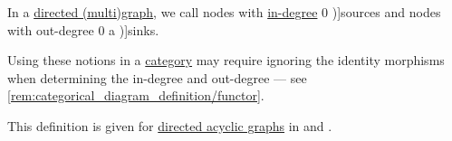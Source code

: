 \begin{definition}\label{def:graph_source_and_sink}\mimprovised
  In a \hyperref[def:directed_multigraph]{directed (multi)graph}, we call nodes with \hyperref[def:graph_cardinality/directed_degree]{in-degree} \( 0 \) \term[en=source (\cite[201]{Harary1969GraphTheory})]{sources} and nodes with out-degree \( 0 \) a \term[en=sink (\cite[201]{Harary1969GraphTheory})]{sinks}.
\end{definition}
\begin{comments}
  \item Using these notions in a \hyperref[def:category]{category} may require ignoring the identity morphisms when determining the in-degree and out-degree --- see \cref{rem:categorical_diagram_definition/functor}.

  \item This definition is given for \hyperref[def:acyclic_graph]{directed acyclic graphs} in \cite[201]{Harary1969GraphTheory} and \cite[231]{Erickson2019Algorithms}.
\end{comments}

